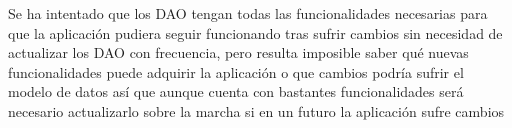 \documentclass[11pt]{article}
\begin{document}
	Se ha intentado que los DAO tengan todas las funcionalidades necesarias para que la aplicación pudiera seguir funcionando tras sufrir cambios sin necesidad de actualizar los DAO con frecuencia, pero resulta imposible saber qué nuevas funcionalidades puede adquirir la aplicación o que cambios podría sufrir el modelo de datos así que aunque cuenta con bastantes funcionalidades será necesario actualizarlo sobre la marcha si en un futuro la aplicación sufre cambios




\end{document}
